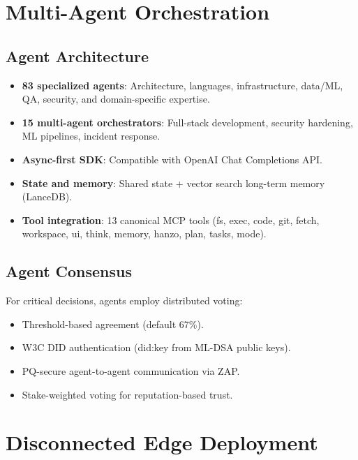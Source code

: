 \documentclass[11pt,letterpaper]{article}
\begin{document}
\section{Multi-Agent Orchestration}

\subsection{Agent Architecture}

\begin{itemize}
\item \textbf{83 specialized agents}: Architecture, languages, infrastructure, data/ML, QA, security, and domain-specific expertise.
\item \textbf{15 multi-agent orchestrators}: Full-stack development, security hardening, ML pipelines, incident response.
\item \textbf{Async-first SDK}: Compatible with OpenAI Chat Completions API.
\item \textbf{State and memory}: Shared state + vector search long-term memory (LanceDB).
\item \textbf{Tool integration}: 13 canonical MCP tools (fs, exec, code, git, fetch, workspace, ui, think, memory, hanzo, plan, tasks, mode).
\end{itemize}

\subsection{Agent Consensus}

For critical decisions, agents employ distributed voting:
\begin{itemize}
\item Threshold-based agreement (default 67\%).
\item W3C DID authentication (did:key from ML-DSA public keys).
\item PQ-secure agent-to-agent communication via ZAP.
\item Stake-weighted voting for reputation-based trust.
\end{itemize}

\section{Disconnected Edge Deployment}
\end{document}
